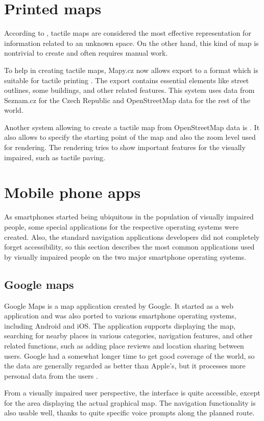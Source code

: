 \documentclass[nolof,digital]{fithesis3}
\begin{document}
\section{Printed maps}
According to \parencite{orientation_aids_from_foundations}, tactile maps are considered the most effective representation for information related to an unknown space. On the other hand, this kind of map is nontrivial to create and often requires manual work.

To help in creating tactile maps, Mapy.cz now allows export to a format which is suitable for tactile printing \parencite{mapycz}. The export contains essential elements like street outlines, some buildings, and other related features. This system uses data from Seznam.cz for the Czech Republic and OpenStreetMap data for the rest of the world.

Another system allowing to create a tactile map from OpenStreetMap data is \parencite{tactile_osm_maps}. It also allows to specify the starting point of the map and also the zoom level used for rendering. The rendering tries to show important features for the visually impaired, such as tactile paving.
\section{Mobile phone apps}
As smartphones started being ubiquitous in the population of visually impaired people, some special applications for the respective operating systems were created. Also, the standard navigation applications developers did not completely forget accessibility, so this section describes the most common applications used by visually impaired people on the two major smartphone operating systems.
\subsection{Google maps}
Google Maps \parencite{googlemaps} is a map application created by Google. It started as a web application and was also ported to various smartphone operating systems, including Android and iOS. The application supports displaying the map, searching for nearby places in various categories, navigation features, and other related functions, such as adding place reviews and location sharing between users. Google had a somewhat longer time to get good coverage of the world, so the data are generally regarded as better than Apple's, but it processes more personal data from the users \parencite{mapcomp}.

From a visually impaired user perspective, the interface is quite accessible, except for the area displaying the actual graphical map. The navigation functionality is also usable well, thanks to quite specific voice prompts along the planned route.
\end{document}
